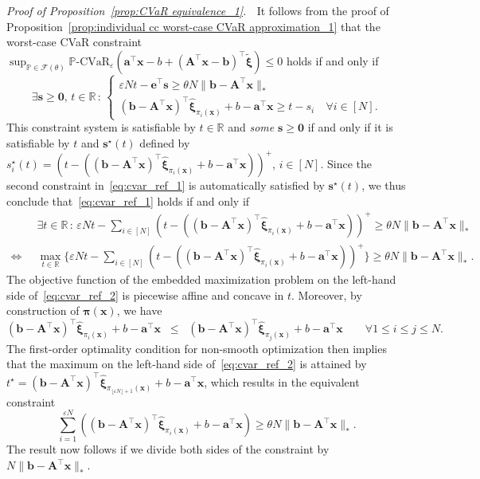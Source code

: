 \documentclass[nonblindrev]{informs2017}
\newcommand{\bmt}[1]{\tilde{\bm{#1}}}
\newcommand{\bmh}[1]{\hat{\bm{#1}}}
\newcommand{\1}[1]{\mathds{1}{\left(#1\right)}}
\begin{document}
\noindent \emph{Proof of Proposition~\ref{prop:CVaR equivalence_1}.} $\;$
It follows from the proof of Proposition~\ref{prop:individual cc worst-case CVaR approximation_1} that the worst-case CVaR constraint $\sup_{\mathbb{P} \in \mathcal{F}(\theta)}\mathbb{P}\text{-CVaR}_{\varepsilon}(\bm{a}^\top\bm{x} - b+ (\bm{A}^\top\bm{x}-\bm{b})^\top\bmt{\xi}) \leq 0$ holds if and only if
\begin{equation}\label{eq:cvar_ref_1}
\exists \bm{s} \geq \bm{0}, \, t \in \mathbb{R} \, : \,
\left\{
\begin{array}{ll}
\varepsilon N t - \bm{e}^\top\bm{s} \geq \theta N \|\bm{b} - \bm{A}^\top\bm{x}\|_* \\
(\bm{b} - \bm{A}^\top\bm{x})^\top\bmh{\xi}_{\pi_i(\bm{x})} + b - \bm{a}^\top\bm{x} \geq t - s_i &~\forall i \in [N].
\end{array}
\right.
\end{equation}
This constraint system is satisfiable by $t \in \mathbb{R}$ and \emph{some} $\bm{s} \geq \bm{0}$ if and only if it is satisfiable by $t$ and $\bm{s}^\star (t)$ defined by $s_i^\star (t) = (t - ((\bm{b} - \bm{A}^\top\bm{x})^\top\bmh{\xi}_{\pi_i(\bm{x})} + b - \bm{a}^\top\bm{x}))^+$, $i \in [N]$. Since the second constraint in~\eqref{eq:cvar_ref_1} is automatically satisfied by $\bm{s}^\star (t)$, we thus conclude that~\eqref{eq:cvar_ref_1} holds if and only if
\begin{align}
& \exists t \in \mathbb{R} \, : \, \varepsilon N t - \sum_{i \in [N]} (t - ((\bm{b} - \bm{A}^\top\bm{x})^\top\bmh{\xi}_{\pi_i(\bm{x})} + b - \bm{a}^\top\bm{x}))^+ \geq \theta N \|\bm{b} - \bm{A}^\top\bm{x}\|_* \nonumber \\
\Longleftrightarrow \;\; & \max_{t \in \mathbb{R}} \bigg\{\varepsilon N t - \sum_{i \in [N]} (t - ((\bm{b} - \bm{A}^\top\bm{x})^\top\bmh{\xi}_{\pi_i(\bm{x})} + b - \bm{a}^\top\bm{x}))^+ \bigg\} \geq \theta N \|\bm{b} - \bm{A}^\top\bm{x}\|_*. \label{eq:cvar_ref_2}
\end{align} 
The objective function of the embedded maximization problem on the left-hand side of~\eqref{eq:cvar_ref_2} is piecewise affine and concave in $t$. Moreover, by construction of $\bm{\pi} (\bm{x})$, we have
\begin{equation*}
(\bm{b} - \bm{A}^\top\bm{x})^\top\bmh{\xi}_{\pi_i(\bm{x})} + b - \bm{a}^\top\bm{x}
\;\; \leq \;\;
(\bm{b} - \bm{A}^\top\bm{x})^\top\bmh{\xi}_{\pi_j(\bm{x})} + b - \bm{a}^\top\bm{x}
\qquad \forall 1 \leq i \leq j \leq N.
\end{equation*}
The first-order optimality condition for non-smooth optimization then implies that the maximum on the left-hand side of~\eqref{eq:cvar_ref_2} is attained by $t^\star = (\bm{b} - \bm{A}^\top\bm{x})^\top\bmh{\xi}_{\pi_{\lfloor\varepsilon N\rfloor + 1}(\bm{x})} + b - \bm{a}^\top\bm{x}$, which results in the equivalent constraint
\begin{equation*}
\sum_{i = 1}^{\varepsilon N} ((\bm{b} - \bm{A}^\top\bm{x})^\top\bmh{\xi}_{\pi_i(\bm{x})} + b - \bm{a}^\top\bm{x}) \ge \theta N \|\bm{b} - \bm{A}^\top\bm{x}\|_*.
\end{equation*}
The result now follows if we divide both sides of the constraint by $N \|\bm{b} - \bm{A}^\top\bm{x}\|_*$.
\hfill \Halmos
\endproof
\end{document}
